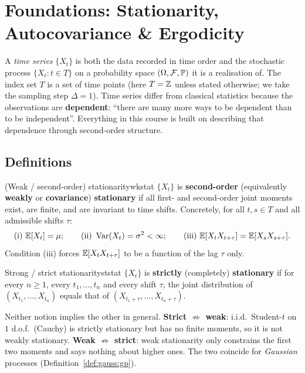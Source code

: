 \section{Foundations: Stationarity, Autocovariance \& Ergodicity}
\label{sec:foundations}

A \emph{time series} $\{X_t\}$ is both the data recorded in time order and the
stochastic process $\{X_t : t\in T\}$ on a probability space
$(\Omega,\mathcal F,\mathbb{P})$ it is a realisation of. The index set $T$ is a set
of time points (here $T=\mathbb{Z}$ unless stated otherwise; we take the sampling
step $\Delta=1$). Time series differ from classical statistics because the
observations are \textbf{dependent}: ``there are many more ways to be dependent
than to be independent''. Everything in this course is built on describing that
dependence through second-order structure.

\subsection{Definitions}

\begin{definition}{(Weak / second-order) stationarity}{wkstat}
$\{X_t\}$ is \textbf{second-order} (equivalently \textbf{weakly} or
\textbf{covariance}) \textbf{stationary} if all first- and second-order joint
moments exist, are finite, and are invariant to time shifts. Concretely, for
all $t,s\in T$ and all admissible shifts $\tau$:
\[
\text{(i) } \mathbb{E}[X_t]=\mu;\qquad
\text{(ii) } \operatorname{Var}(X_t)=\sigma^2<\infty;\qquad
\text{(iii) } \mathbb{E}[X_tX_{t+\tau}]=\mathbb{E}[X_sX_{s+\tau}].
\]
Condition (iii) forces $\mathbb{E}[X_tX_{t+\tau}]$ to be a function of the lag $\tau$
only.
\end{definition}

\begin{definition}{Strong / strict stationarity}{ststat}
$\{X_t\}$ is \textbf{strictly} (completely) \textbf{stationary} if for every
$n\ge1$, every $t_1,\dots,t_n$ and every shift $\tau$, the joint distribution
of $(X_{t_1},\dots,X_{t_n})$ equals that of
$(X_{t_1+\tau},\dots,X_{t_n+\tau})$.
\end{definition}

\begin{intuition}
Neither notion implies the other in general.
\textbf{Strict $\not\Rightarrow$ weak}: i.i.d.\ Student-$t$ on $1$ d.o.f.\
(Cauchy) is strictly stationary but has no finite moments, so it is not weakly
stationary. \textbf{Weak $\not\Rightarrow$ strict}: weak stationarity only
constrains the first two moments and says nothing about higher ones. The two
coincide for \emph{Gaussian} processes (Definition~\ref{def:gauss:gp}).
\end{intuition}

